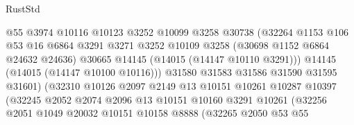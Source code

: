 \begin{lexlean}{RustStd}
\begin{coremodule}
                                    @55
                                    @3974
                                    @10116
                                    @10123
                                    @3252
                                    @10099
                                    @3258
                                    @30738
                                    (@32264
                                      @1153
                                      @106
                                      @53
                                      @16
                                      @6864
                                      @3291
                                      @3271
                                      @3252
                                      @10109
                                      @3258
                                      (@30698 @1152 @6864 @24632 @24636)
                                      @30665
                                      @14145
                                      (@14015 (@14147 @10110 @3291)))
                                    @14145
                                    (@14015 (@14147 @10100 @10116)))
                                  @31580
                                  @31583
                                  @31586
                                  @31590
                                  @31595
                                  @31601)
                                (@32310
                                  @10126
                                  @2097
                                  @2149
                                  @13
                                  @10151
                                  @10261
                                  @10287
                                  @10397
                                  (@32245
                                    @2052
                                    @2074
                                    @2096
                                    @13
                                    @10151
                                    @10160
                                    @3291
                                    @10261
                                    (@32256
                                      @2051
                                      @1049
                                      @20032
                                      @10151
                                      @10158
                                      @8888
                                      (@32265
                                        @2050
                                        @53
                                        @55

\end{coremodule}
\end{lexlean}
